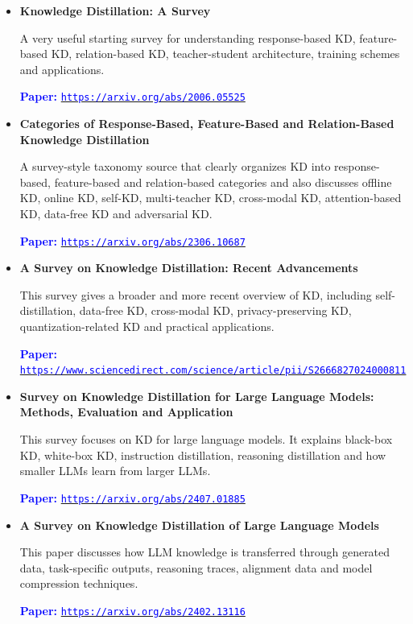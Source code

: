 \documentclass[10pt]{article}
\begin{document}
\begin{itemize}

\item \textbf{Knowledge Distillation: A Survey}\par
A very useful starting survey for understanding response-based KD, feature-based KD, relation-based KD, teacher-student architecture, training schemes and applications.\par
\textcolor{blue}{\textbf{Paper:}} \href{https://arxiv.org/abs/2006.05525}{\textcolor{blue}{\nolinkurl{https://arxiv.org/abs/2006.05525}}}

\item \textbf{Categories of Response-Based, Feature-Based and Relation-Based Knowledge Distillation}\par
A survey-style taxonomy source that clearly organizes KD into response-based, feature-based and relation-based categories and also discusses offline KD, online KD, self-KD, multi-teacher KD, cross-modal KD, attention-based KD, data-free KD and adversarial KD.\par
\textcolor{blue}{\textbf{Paper:}} \href{https://arxiv.org/abs/2306.10687}{\textcolor{blue}{\nolinkurl{https://arxiv.org/abs/2306.10687}}}

\item \textbf{A Survey on Knowledge Distillation: Recent Advancements}\par
This survey gives a broader and more recent overview of KD, including self-distillation, data-free KD, cross-modal KD, privacy-preserving KD, quantization-related KD and practical applications.\par
\textcolor{blue}{\textbf{Paper:}} \href{https://www.sciencedirect.com/science/article/pii/S2666827024000811}{\textcolor{blue}{\nolinkurl{https://www.sciencedirect.com/science/article/pii/S2666827024000811}}}

\item \textbf{Survey on Knowledge Distillation for Large Language Models: Methods, Evaluation and Application}\par
This survey focuses on KD for large language models. It explains black-box KD, white-box KD, instruction distillation, reasoning distillation and how smaller LLMs learn from larger LLMs.\par
\textcolor{blue}{\textbf{Paper:}} \href{https://arxiv.org/abs/2407.01885}{\textcolor{blue}{\nolinkurl{https://arxiv.org/abs/2407.01885}}}

\item \textbf{A Survey on Knowledge Distillation of Large Language Models}\par
This paper discusses how LLM knowledge is transferred through generated data, task-specific outputs, reasoning traces, alignment data and model compression techniques.\par
\textcolor{blue}{\textbf{Paper:}} \href{https://arxiv.org/abs/2402.13116}{\textcolor{blue}{\nolinkurl{https://arxiv.org/abs/2402.13116}}}


\end{itemize}
\end{document}
